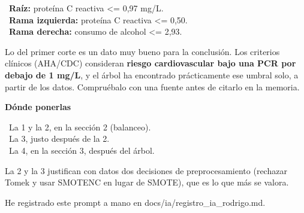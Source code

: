 \documentclass[11pt,a4paper]{article}
\begin{document}
{\hspace*{1.0em}\textbullet~\textbf{Raíz:} proteína C reactiva \textless{}= 0,97 mg/\allowbreak{}L. \\{}
\hspace*{1.0em}\textbullet~\textbf{Rama izquierda:} proteína C reactiva \textless{}= 0,50. \\{}
\hspace*{1.0em}\textbullet~\textbf{Rama derecha:} consumo de alcohol \textless{}= 2,93.

Lo del primer corte es un dato muy bueno para la conclusión. Los criterios clínicos (AHA/\allowbreak{}CDC) consideran \textbf{riesgo cardiovascular bajo una PCR por debajo de 1 mg/\allowbreak{}L}, y el árbol ha encontrado prácticamente ese umbral solo, a partir de los datos. Compruébalo con una fuente antes de citarlo en la memoria.

\smallskip\noindent\textbf{Dónde ponerlas}\par
\hspace*{1.0em}\textbullet~La 1 y la 2, en la sección 2 (balanceo). \\{}
\hspace*{1.0em}\textbullet~La 3, justo después de la 2. \\{}
\hspace*{1.0em}\textbullet~La 4, en la sección 3, después del árbol.

La 2 y la 3 justifican con datos dos decisiones de preprocesamiento (rechazar Tomek y usar SMOTENC en lugar de SMOTE), que es lo que más se valora.

He registrado este prompt a mano en docs/\allowbreak{}ia/\allowbreak{}registro\_\allowbreak{}ia\_\allowbreak{}rodrigo.md.

}
\end{document}
